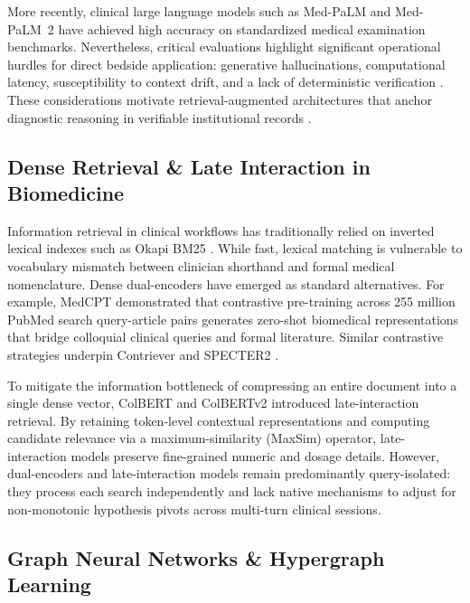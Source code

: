 \documentclass[10pt, onecolumn]{article}
\begin{document}
More recently, clinical large language models such as Med-PaLM and Med-PaLM~2 \cite{singhal2023large} have achieved high accuracy on standardized medical examination benchmarks. Nevertheless, critical evaluations highlight significant operational hurdles for direct bedside application: generative hallucinations, computational latency, susceptibility to context drift, and a lack of deterministic verification \cite{moor2023foundation,wornow2023shaky}. These considerations motivate retrieval-augmented architectures that anchor diagnostic reasoning in verifiable institutional records \cite{lewis2020retrieval,zakka2024almanac}.

\subsection{Dense Retrieval \& Late Interaction in Biomedicine}

Information retrieval in clinical workflows has traditionally relied on inverted lexical indexes such as Okapi BM25 \cite{baeza1999modern}. While fast, lexical matching is vulnerable to vocabulary mismatch between clinician shorthand and formal medical nomenclature. Dense dual-encoders have emerged as standard alternatives. For example, MedCPT \cite{jin2023medcpt} demonstrated that contrastive pre-training across 255 million PubMed search query-article pairs generates zero-shot biomedical representations that bridge colloquial clinical queries and formal literature. Similar contrastive strategies underpin Contriever \cite{izacard2022unsupervised} and SPECTER2 \cite{singh2023scirepeval}.

To mitigate the information bottleneck of compressing an entire document into a single dense vector, ColBERT and ColBERTv2 \cite{santhanam2022colbertv2} introduced late-interaction retrieval. By retaining token-level contextual representations and computing candidate relevance via a maximum-similarity (MaxSim) operator, late-interaction models preserve fine-grained numeric and dosage details. However, dual-encoders and late-interaction models remain predominantly query-isolated: they process each search independently and lack native mechanisms to adjust for non-monotonic hypothesis pivots across multi-turn clinical sessions.

\subsection{Graph Neural Networks \& Hypergraph Learning}
\end{document}
